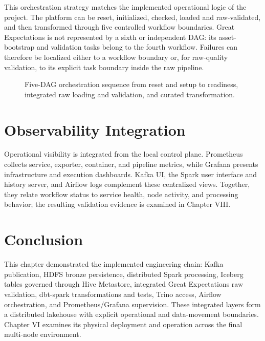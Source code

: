 This orchestration strategy matches the implemented operational logic of the project. The platform can be reset, initialized, checked, loaded and raw-validated, and then transformed through five controlled workflow boundaries. Great Expectations is not represented by a sixth or independent DAG: its asset-bootstrap and validation tasks belong to the fourth workflow. Failures can therefore be localized either to a workflow boundary or, for raw-quality validation, to its explicit task boundary inside the raw pipeline.

\begin{figure}[H]
    \centering
    
    \caption{Five-DAG orchestration sequence from reset and setup to readiness, integrated raw loading and validation, and curated transformation.}
    \label{fig:chapter5-dag-sequence}
\end{figure}
\FloatBarrier

\section{Observability Integration}
Operational visibility is integrated from the local control plane. Prometheus collects service, exporter, container, and pipeline metrics, while Grafana presents infrastructure and execution dashboards. Kafka UI, the Spark user interface and history server, and Airflow logs complement these centralized views. Together, they relate workflow status to service health, node activity, and processing behavior; the resulting validation evidence is examined in Chapter VIII.

\section{Conclusion}
This chapter demonstrated the implemented engineering chain: Kafka publication, HDFS bronze persistence, distributed Spark processing, Iceberg tables governed through Hive Metastore, integrated Great Expectations raw validation, dbt-spark transformations and tests, Trino access, Airflow orchestration, and Prometheus/Grafana supervision. These integrated layers form a distributed lakehouse with explicit operational and data-movement boundaries. Chapter VI examines its physical deployment and operation across the final multi-node environment.

